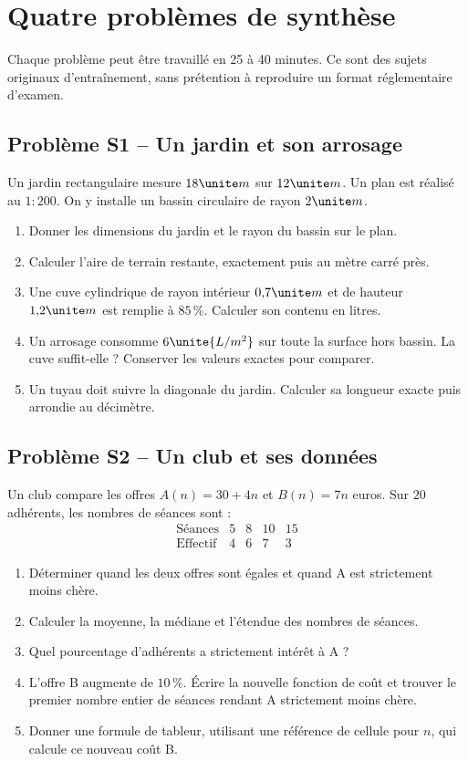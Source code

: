 \chapter{Quatre problèmes de synthèse}

Chaque problème peut être travaillé en 25 à 40 minutes. Ce sont des sujets originaux d’entraînement, sans prétention à reproduire un format réglementaire d’examen.

\section*{Problème S1 -- Un jardin et son arrosage}

Un jardin rectangulaire mesure $18\unite m$ sur $12\unite m$. Un plan est réalisé au $1:200$. On y installe un bassin circulaire de rayon $2\unite m$.
\begin{enumerate}
\item Donner les dimensions du jardin et le rayon du bassin sur le plan.
\item Calculer l'aire de terrain restante, exactement puis au mètre carré près.
\item Une cuve cylindrique de rayon intérieur $0{,}7\unite m$ et de hauteur $1{,}2\unite m$ est remplie à $85\,\%$. Calculer son contenu en litres.
\item Un arrosage consomme $6\unite{L/m^2}$ sur toute la surface hors bassin. La cuve suffit-elle ? Conserver les valeurs exactes pour comparer.
\item Un tuyau doit suivre la diagonale du jardin. Calculer sa longueur exacte puis arrondie au décimètre.
\end{enumerate}

\section*{Problème S2 -- Un club et ses données}

Un club compare les offres $A(n)=30+4n$ et $B(n)=7n$ euros. Sur $20$ adhérents, les nombres de séances sont :
\[
\begin{array}{c|rrrr}\text{Séances}&5&8&10&15\\\hline\text{Effectif}&4&6&7&3\end{array}
\]
\begin{enumerate}
\item Déterminer quand les deux offres sont égales et quand A est strictement moins chère.
\item Calculer la moyenne, la médiane et l'étendue des nombres de séances.
\item Quel pourcentage d'adhérents a strictement intérêt à A ?
\item L'offre B augmente de $10\,\%$. Écrire la nouvelle fonction de coût et trouver le premier nombre entier de séances rendant A strictement moins chère.
\item Donner une formule de tableur, utilisant une référence de cellule pour $n$, qui calcule ce nouveau coût B.
\end{enumerate}

